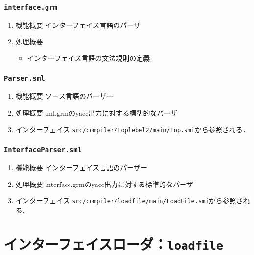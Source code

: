 \documentclass{jbook}
\newcommand{\txt}[2]{#1}
\newcommand{\code}[1]{\mbox{\large\tt #1}}
\begin{document}
\subsection{\code{interface.grm}}
\begin{enumerate}
\item 機能概要 インターフェイス言語のパーザ
\item 処理概要 
\begin{itemize}
\item インターフェイス言語の文法規則の定義
\end{itemize}
\end{enumerate}

\subsection{\code{Parser.sml}}
\begin{enumerate}
\item 機能概要 ソース言語のパーザー
\item 処理概要 iml.grmのyacc出力に対する標準的なパーザ
\item インターフェイス
\code{src/compiler/toplebel2/main/Top.smi}から参照される．
\end{enumerate}

\subsection{\code{InterfaceParser.sml}}
\begin{enumerate}
\item 機能概要 インターフェイス言語のパーザー
\item 処理概要 interface.grmのyacc出力に対する標準的なパーザ
\item インターフェイス
\code{src/compiler/loadfile/main/LoadFile.smi}から参照される．
\end{enumerate}
\else%
\fi%


% 
\chapter{\txt
{インターフェイスローダ：\code{loadfile}}
{The interface file loader : \code{loadfile}}
}
\label{chap:Loadfile}
\end{document}
